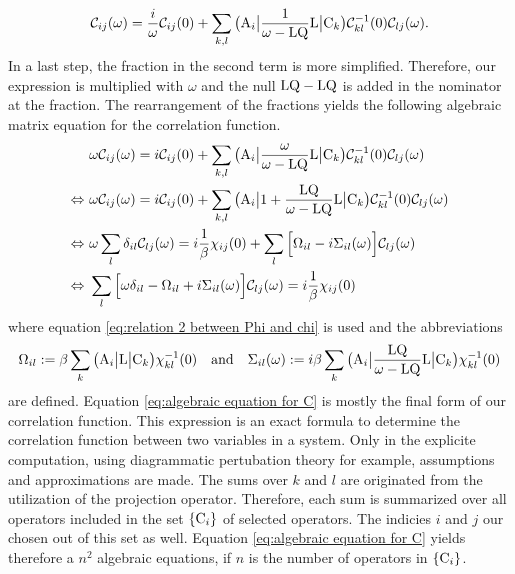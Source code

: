 %
\begin{align}
	\mathcal{C}_{ij}(\omega) = \frac{i}{\omega} \mathcal{C}_{ij}(0) + \sum\limits_{k,l} \big({\mathrm{A}_{i}}\big| \frac{1}{\omega - \mathrm{LQ}} \mathrm{L} \big|{\mathrm{C}_{k}}\big) \mathcal{C}_{kl}^{-1}(0) \mathcal{C}_{lj}(\omega).
\end{align}
%
In a last step, the fraction in the second term is more simplified.
Therefore, our expression is multiplied with $\omega$ and the null $\mathrm{LQ} - \mathrm{LQ}$ is added in the nominator at the fraction.
The rearrangement of the fractions yields the following algebraic matrix equation for the correlation function.
%
\begin{align}
	&\omega \mathcal{C}_{ij}(\omega) = i \mathcal{C}_{ij}(0) + \sum\limits_{k,l} \big({\mathrm{A}_{i}}\big| \frac{\omega}{\omega - \mathrm{LQ}} \mathrm{L} \big|{\mathrm{C}_{k}}\big) \mathcal{C}_{kl}^{-1}(0) \mathcal{C}_{lj}(\omega)
	\notag \\
	\Leftrightarrow\ &\omega \mathcal{C}_{ij}(\omega) = i \mathcal{C}_{ij}(0) + \sum\limits_{k,l} \big({\mathrm{A}_{i}}\big| 1 + \frac{\mathrm{LQ}}{\omega - \mathrm{LQ}} \mathrm{L} \big|{\mathrm{C}_{k}}\big) \mathcal{C}_{kl}^{-1}(0) \mathcal{C}_{lj}(\omega)
	\notag \\
	\Leftrightarrow\ &\omega \sum\limits_{l} \delta_{il} \mathcal{C}_{lj}(\omega) = i \frac{1}{\beta} \chi_{ij}(0) + \sum\limits_{l} \Big[\Omega_{il} -i \Sigma_{il}(\omega)\Big]  \mathcal{C}_{lj}(\omega)
	\notag \\
	\Leftrightarrow\ &\sum\limits_{l} \Big[\omega \delta_{il} - \Omega_{il} + i \Sigma_{il}(\omega)\Big] \mathcal{C}_{lj}(\omega) = i \frac{1}{\beta} \chi_{ij}(0)
	\label{eq:algebraic equation for C}
\end{align}
%
where equation \eqref{eq:relation 2 between Phi and chi} is used and the abbreviations
%
\begin{align}
	\Omega_{il} := \beta \sum\limits_{k} \obra{\mt{A}_{i}} \mt{L} \oket{\mt{C}_{k}} \chi_{kl}^{-1}(0)
	\qq{and}
	\Sigma_{il}(\omega) := i \beta \sum\limits_{k} \obra{\mt{A}_{i}} \frac{\mt{LQ}}{\omega - \mt{LQ}} \mt{L} \oket{\mt{C}_{k}} \chi_{kl}^{-1}(0)
\end{align}
%
are defined.
Equation \eqref{eq:algebraic equation for C} is mostly the final form of our correlation function.
This expression is an exact formula to determine the correlation function between two variables in a system.
Only in the explicite computation, using diagrammatic pertubation theory for example, assumptions and approximations are made.
The sums over $k$ and $l$ are originated from the utilization of the projection operator.
Therefore, each sum is summarized over all operators included in the set $\{\mathrm{C}_{i}\}$ of selected operators.
The indicies $i$ and $j$ our chosen out of this set as well.
Equation \eqref{eq:algebraic equation for C} yields therefore a $n^{2}$ algebraic equations, if $n$ is the number of operators in $\{\mathrm{C}_{i}\}$.

